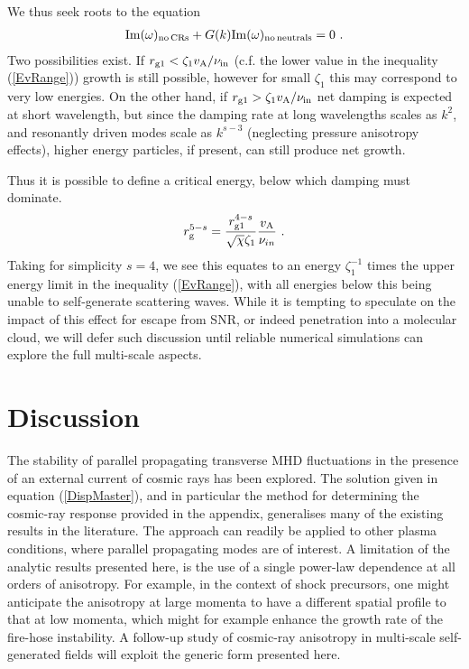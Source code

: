 \documentclass[a4paper,fleqn,usenatbib]{mnras}
\newcommand{\eqb}{\begin{eqnarray}}
\newcommand{\eqe}{\end{eqnarray}}
\begin{document}
We thus seek roots to the equation  
\eqb
{\rm Im}(\omega)_{\rm no\, CRs} + G(k) {\rm Im}(\omega)_{\rm no\,neutrals}=0~.
\eqe
Two possibilities exist. If $r_{\rm g1} < \zeta_1 v_{\rm A}/\nu_{\rm in}$ (c.f. the lower value in the inequality (\ref{EvRange})) growth is still possible, however for small $\zeta_1$ this may correspond to very low energies. On the other hand, if $r_{\rm g1} > \zeta_1 v_{\rm A}/\nu_{\rm in}$ net damping is expected at short wavelength, but since the damping rate at long wavelengths scales as $k^2$, and resonantly driven modes scale as $k^{s-3}$ (neglecting pressure anisotropy effects), higher energy particles, if present, can still produce net growth.  

Thus it is possible to define a critical energy, below which 
damping must dominate. 
\eqb
r_{\rm g}^{5-s} = \frac{r_{\rm g1}^{4-s}}{\sqrt{\chi}\zeta_1}\frac{v_{\rm A}}{\nu_{in}}~.
\eqe
Taking for simplicity $s=4$, we see this equates to an energy $\zeta_1^{-1}$ times the upper energy limit in the inequality (\ref{EvRange}), with all energies below this being unable to self-generate scattering waves. 
While it is tempting to speculate on the impact of this effect for escape from SNR, or indeed penetration into a molecular cloud, we will defer such discussion until reliable numerical simulations can explore the full multi-scale aspects.  

\section{Discussion}
\label{sec:5}

The stability of parallel propagating transverse MHD fluctuations in the presence of an external current of cosmic rays has been explored. The solution given in equation (\ref{DispMaster}), and in particular the method for determining the cosmic-ray response provided in the appendix, generalises many of the existing results in the literature. The approach can readily be applied to other plasma conditions, where parallel propagating modes are of interest. A limitation of the analytic results presented here, is the use of a single power-law dependence at all orders of anisotropy. For example, in the context of shock precursors, one might anticipate the anisotropy at large momenta to have a different spatial profile to that at low momenta, which might for example enhance the growth rate of the fire-hose instability. A follow-up study of cosmic-ray anisotropy in multi-scale self-generated fields will exploit the generic form presented here.
\end{document}
